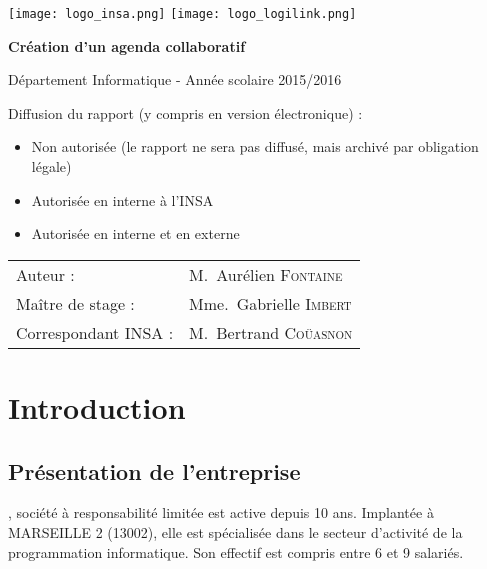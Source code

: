 \documentclass[a4paper, 11pt]{report}
\begin{document}
    \begin{titlepage}
        \texttt{[image: logo\_insa.png]}
        \hspace{0.35\textwidth}
        \texttt{[image: logo\_logilink.png]}
        \begin{center}
            \vspace{7cm}
            {\huge\bfseries Création d'un agenda collaboratif \par}
            \vspace{0.5cm}
            {\Large Département Informatique - Année scolaire 2015/2016\par}
        \end{center}
        \vfill

        Diffusion du rapport (y compris en version électronique) :

        \begin{itemize}[label=$\square$]
            \item Non autorisée (le rapport ne sera pas diffusé, mais archivé par obligation légale)
            \item Autorisée en interne à l’INSA
            \item Autorisée en interne et en externe
        \end{itemize}

        \vspace{0.5cm}

        \begin{tabular}{ll}
            {\Large Auteur :}             & M.~Aurélien \textsc{Fontaine}\\
            {\Large Maître de stage :}    & Mme.~Gabrielle \textsc{Imbert}\\
            {\Large Correspondant INSA :} & M.~Bertrand \textsc{Coüasnon}\\
        \end{tabular}
    \end{titlepage}

\tableofcontents

\part{Introduction}
\chapter{Présentation de l'entreprise}
\logilink, société à responsabilité limitée est active depuis 10 ans.
Implantée à MARSEILLE 2 (13002), elle est spécialisée dans le secteur d'activité de la programmation informatique. Son effectif est compris entre 6 et 9 salariés.
\end{document}
